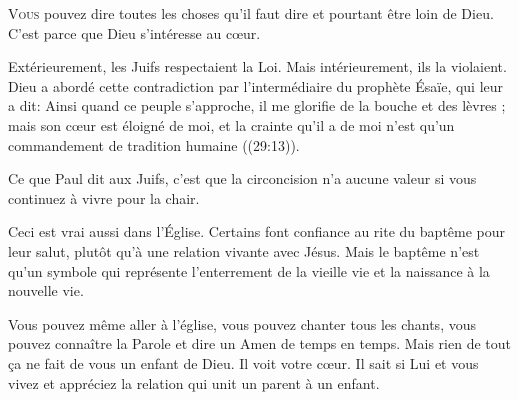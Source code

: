 



\lettrine{V}{ous} pouvez dire toutes les choses qu'il faut dire
 et pourtant être loin de Dieu. C'est parce que Dieu s'intéresse au c\oe{}ur.

Extérieurement, les Juifs respectaient la Loi.
 Mais intérieurement, ils la violaient.
 Dieu a abordé cette contradiction par l'intermédiaire
 du prophète Ésaïe, qui leur a dit: 
 \Og Ainsi quand ce peuple s'approche, il me glorifie de la bouche
 et des lèvres ; mais son c\oe{}ur est éloigné de moi, et la crainte
 qu'il a de moi n'est qu'un commandement de tradition humaine \Fg{}
 ((29:13)). 


Ce que Paul dit aux Juifs, c'est que la circoncision n'a aucune valeur
 si vous continuez à vivre pour la chair.

Ceci est vrai aussi dans l'Église. 
 Certains font confiance au rite du baptême pour leur salut,
 plutôt qu'à une relation vivante avec Jésus.
 Mais le baptême n'est qu'un symbole qui représente l'enterrement
 de la vieille vie et la naissance à la nouvelle vie.

Vous pouvez même aller à l'église, vous pouvez chanter tous les chants,
 vous pouvez connaître la Parole et dire un \Og Amen \Fg{} de temps en temps.
 Mais rien de tout \c{c}a ne fait de vous un enfant de Dieu.
 Il voit votre c\oe{}ur. Il sait si Lui et vous vivez et appréciez
 la relation qui unit un parent à un enfant.

\dvrule



